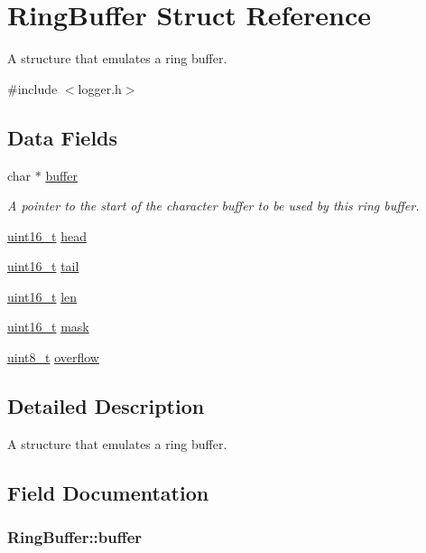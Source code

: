 \hypertarget{structRingBuffer}{\section{Ring\-Buffer Struct Reference}
\label{structRingBuffer}
}


A structure that emulates a ring buffer.  




{\ttfamily \#include $<$logger.\-h$>$}

\subsection*{Data Fields}
\begin{DoxyCompactItemize}
\item 
char $\ast$ \hyperlink{structRingBuffer_aab96a16b4002b0b6c5a633f04116fb26}{buffer}
\begin{DoxyCompactList}\small\item\em A pointer to the start of the character buffer to be used by this ring buffer. \end{DoxyCompactList}\item 
\hyperlink{typedefs_8h_a1f1825b69244eb3ad2c7165ddc99c956}{uint16\-\_\-t} \hyperlink{structRingBuffer_a8c9823e492bfbf2cbeac47842a016064}{head}
\item 
\hyperlink{typedefs_8h_a1f1825b69244eb3ad2c7165ddc99c956}{uint16\-\_\-t} \hyperlink{structRingBuffer_aa2c8753c26e7a2641f6ee9f4464455e8}{tail}
\item 
\hyperlink{typedefs_8h_a1f1825b69244eb3ad2c7165ddc99c956}{uint16\-\_\-t} \hyperlink{structRingBuffer_a923fbf140b33a972b4a9ee600d3b2c8f}{len}
\item 
\hyperlink{typedefs_8h_a1f1825b69244eb3ad2c7165ddc99c956}{uint16\-\_\-t} \hyperlink{structRingBuffer_a1a2bdd08c426bd4721d7c3d6f68c93d6}{mask}
\item 
\hyperlink{typedefs_8h_aba7bc1797add20fe3efdf37ced1182c5}{uint8\-\_\-t} \hyperlink{structRingBuffer_a2477690ded4ea57e830d91c05bf5ae70}{overflow}
\end{DoxyCompactItemize}


\subsection{Detailed Description}
A structure that emulates a ring buffer. 

\subsection{Field Documentation}
\hypertarget{structRingBuffer_aab96a16b4002b0b6c5a633f04116fb26}{
\subsubsection[{buffer}]{\setlength{\rightskip}{0pt plus 5cm}Ring\-Buffer\-::buffer}}\label{structRingBuffer_aab96a16b4002b0b6c5a633f04116fb26}


